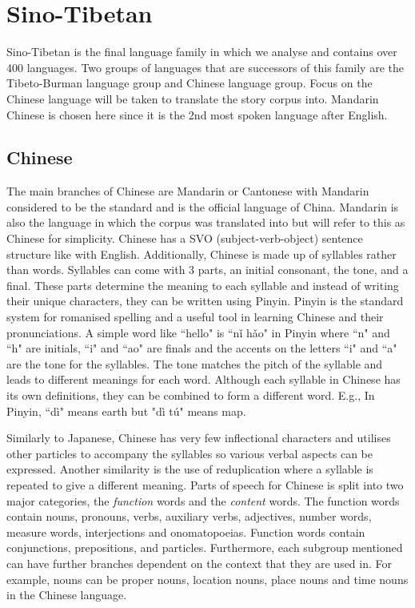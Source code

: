 \section{Sino-Tibetan}
Sino-Tibetan is the final language family in which we analyse and contains over 400 languages. Two groups of languages that are successors of this family are the Tibeto-Burman language group and Chinese language group. Focus on the Chinese language will be taken to translate the story corpus into. Mandarin Chinese is chosen here since it is the 2nd most spoken language after English.

\subsection{Chinese}
The main branches of Chinese are Mandarin or Cantonese with Mandarin considered to be the standard and is the official language of China. Mandarin is also the language in which the corpus was translated into but will refer to this as Chinese for simplicity. Chinese has a SVO (subject-verb-object) sentence structure like with English. Additionally, Chinese is made up of syllables \cite{ross2017modern} rather than words. Syllables can come with 3 parts, an initial consonant, the tone, and a final. These parts determine the meaning to each syllable and instead of writing their unique characters, they can be written using Pinyin. Pinyin is the standard system for romanised spelling and a useful tool in learning Chinese and their pronunciations. A simple word like ``hello" is ``nǐ hǎo" in Pinyin where ``n" and ``h" are initials, ``i" and ``ao" are finals and the accents on the letters ``i" and ``a" are the tone for the syllables. The tone matches the pitch of the syllable and leads to different meanings for each word. Although each syllable in Chinese has its own definitions, they can be combined to form a different word. E.g., In Pinyin, ``dì" means earth but "dì tú" means map.

Similarly to Japanese, Chinese has very few inflectional characters and utilises other particles to accompany the syllables so various verbal aspects can be expressed. Another similarity is the use of reduplication where a syllable is repeated to give a different meaning. Parts of speech for Chinese is split into two major categories, the \emph{function} words and the \emph{content} words. The function words contain nouns, pronouns, verbs, auxiliary verbs, adjectives, number words, measure words, interjections and onomatopoeias. Function words contain conjunctions, prepositions, and particles. Furthermore, each subgroup mentioned can have further branches dependent on the context that they are used in. For example, nouns can be proper nouns, location nouns, place nouns and time nouns in the Chinese language.

